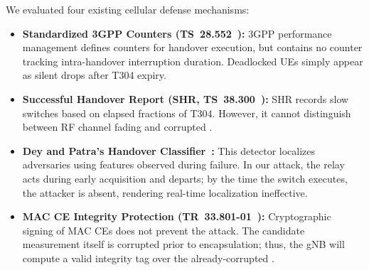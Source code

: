 We evaluated four existing cellular defense mechanisms:
\begin{itemize}\itemsep2pt
  \item \textbf{Standardized 3GPP Counters (TS~28.552~\cite{3gpp28552}):} 3GPP performance management
        defines counters for handover execution, but contains no counter tracking intra-handover
        interruption duration. Deadlocked UEs simply appear as silent drops after T304 expiry.
  \item \textbf{Successful Handover Report (SHR, TS~38.300~\cite{3gpp38300}):} SHR records slow switches
        based on elapsed fractions of T304. However, it cannot distinguish between RF channel fading and
        corrupted \TA{}.
  \item \textbf{Dey and Patra's Handover Classifier~\cite{dey2025secure}:} This detector localizes
        adversaries using features observed during failure. In our attack, the relay acts during early
        acquisition and departs; by the time the switch executes, the attacker is absent, rendering
        real-time localization ineffective.
  \item \textbf{MAC CE Integrity Protection (TR~33.801-01~\cite{3gpp33801}):} Cryptographic signing of
        MAC CEs does not prevent the attack. The candidate \TA{} measurement itself is corrupted prior to
        encapsulation; thus, the gNB will compute a valid integrity tag over the already-corrupted \TA{}.
\end{itemize}
